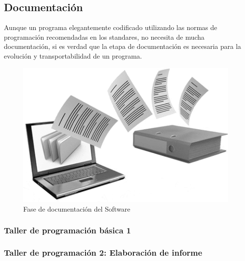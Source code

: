 \documentclass[a4paper,12pt,spanish]{article}
\begin{document}
\subsection{Documentación}
\label{sec:la-etapa-de-4}
Aunque un programa elegantemente codificado utilizando las normas de
programación recomendadas en los standares, no necesita de mucha
documentación, si es verdad que la etapa de documentación es necesaria
para la evolución y transportabilidad de un programa.

\begin{figure}[H]
  \centering
  \includegraphics[scale=0.3]{documentacion}
  \caption{Fase de documentación del Software}
  \label{fig:documentacion}
\end{figure}




\subsubsection{Taller de programación básica 1}
\label{sec:tall-de-progr}

\vfill

\subsubsection{Taller de programación 2: Elaboración de informe}
\label{sec:tall-de-progr-1}

\vfill
\end{document}
